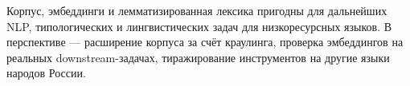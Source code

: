 \documentclass{article}
\begin{document}
Корпус, эмбеддинги и лемматизированная лексика пригодны для дальнейших NLP, типологических и лингвистических задач для низкоресурсных языков. В перспективе — расширение корпуса за счёт краулинга, проверка эмбеддингов на реальных downstream-задачах, тиражирование инструментов на другие языки народов России.



\end{document}

